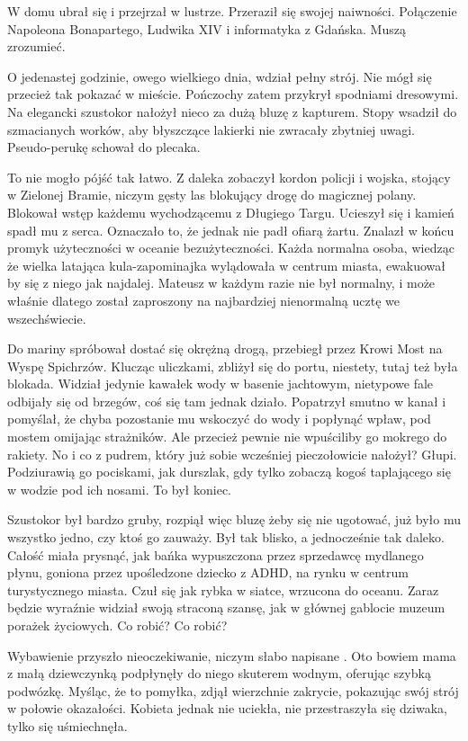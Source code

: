 W domu ubrał się i przejrzał w lustrze. Przeraził się swojej naiwności.
Połączenie Napoleona Bonapartego, Ludwika XIV i informatyka z Gdańska.
Muszą zrozumieć.

O jedenastej godzinie, owego wielkiego dnia, wdział pełny strój.
Nie mógł się przecież tak pokazać w mieście.
Pończochy zatem przykrył spodniami dresowymi.
Na elegancki szustokor nałożył nieco za dużą bluzę z kapturem.
Stopy wsadził do szmacianych worków, aby błyszczące lakierki nie zwracały zbytniej uwagi.
Pseudo-perukę schował do plecaka.

To nie mogło pójść tak łatwo.
Z daleka zobaczył kordon policji i wojska, stojący w Zielonej Bramie, niczym gęsty las blokujący drogę do magicznej polany.
Blokował wstęp każdemu wychodzącemu z Długiego Targu.
Ucieszył się i kamień spadł mu z serca. Oznaczało to, że jednak nie padł ofiarą żartu.
Znalazł w końcu promyk użyteczności w oceanie bezużyteczności. Każda normalna osoba, wiedząc że wielka latająca kula-zapominajka wylądowała w centrum miasta,
ewakuował by się z niego jak najdalej. 
Mateusz w każdym razie nie był normalny, i może właśnie dlatego został zaproszony na najbardziej nienormalną ucztę we wszechświecie.

Do mariny spróbował dostać się okrężną drogą, przebiegł przez Krowi Most na Wyspę Spichrzów.
Klucząc uliczkami, zbliżył się do portu, niestety, tutaj też była blokada.
Widział jedynie kawałek wody w basenie jachtowym, nietypowe fale odbijały się od brzegów, coś się tam jednak działo.
Popatrzył smutno w kanał i pomyślał, że chyba pozostanie mu wskoczyć do wody i popłynąć wpław, pod mostem omijając strażników.
Ale przecież pewnie nie wpuściliby go mokrego do rakiety.
No i co z pudrem, który już sobie wcześniej pieczołowicie nałożył?
Głupi. Podziurawią go pociskami, jak durszlak, gdy tylko zobaczą kogoś taplającego się w wodzie pod ich nosami.
To był koniec.

Szustokor był bardzo gruby, rozpiął więc bluzę żeby się nie ugotować, już było mu wszystko jedno, czy ktoś go zauważy.
Był tak blisko, a jednocześnie tak daleko. 
Całość miała prysnąć, jak bańka wypuszczona przez sprzedawcę mydlanego płynu, 
goniona przez upośledzone dziecko z ADHD, na rynku w centrum turystycznego miasta.
Czuł się jak rybka w siatce, wrzucona do oceanu.
Zaraz będzie wyraźnie widział swoją straconą szansę, jak w głównej gablocie muzeum porażek życiowych.
Co robić? Co robić?

Wybawienie przyszło nieoczekiwanie, niczym słabo napisane .
Oto bowiem mama z małą dziewczynką podpłynęły do niego skuterem wodnym, oferując szybką podwózkę.
Myśląc, że to pomyłka, zdjął wierzchnie zakrycie, pokazując swój strój w połowie okazałości.
Kobieta jednak nie uciekła, nie przestraszyła się dziwaka, tylko się uśmiechnęła.

